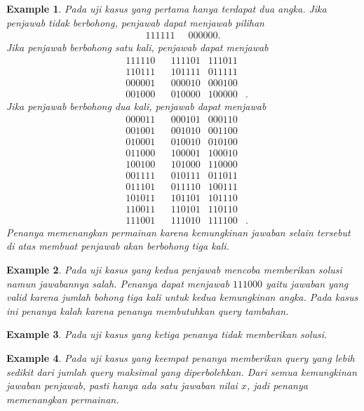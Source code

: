 \documentclass[conference,compsoc]{IEEEtran}
\newtheorem{exmp}{Example}[section]
\begin{document}
\begin{exmp}
Pada uji kasus yang pertama hanya terdapat dua angka. Jika penjawab tidak berbohong, penjawab dapat menjawab pilihan
\begin{align*}
111111 \;\;& 000000\textrm{.}
\end{align*}
Jika penjawab berbohong satu kali, penjawab dapat menjawab 
\begin{align*}
& 111110 & & 111101 & 111011 \\
& 110111 & & 101111 & 011111 \\
& 000001 & & 000010 & 000100 \\
& 001000 & & 010000 & 100000 &\textrm{.}
\end{align*}
Jika penjawab berbohong dua kali, penjawab dapat menjawab
\begin{align*}
& 000011 & & 000101 & 000110 \\
& 001001 & & 001010 & 001100 \\
& 010001 & & 010010 & 010100 \\
& 011000 & & 100001 & 100010 \\
& 100100 & & 101000 & 110000 \\
& 001111 & & 010111 & 011011 \\
& 011101 & & 011110 & 100111 \\
& 101011 & & 101101 & 101110 \\
& 110011 & & 110101 & 110110 \\
& 111001 & & 111010 & 111100 &\textrm{.}
\end{align*}
Penanya memenangkan permainan karena kemungkinan jawaban selain tersebut di atas membuat penjawab akan berbohong tiga kali.
\end{exmp}

\begin{exmp}
Pada uji kasus yang kedua penjawab mencoba memberikan solusi namun jawabannya salah. Penanya dapat menjawab $111000$ yaitu jawaban yang valid karena jumlah bohong tiga kali untuk kedua kemungkinan angka. Pada kasus ini penanya kalah karena penanya membutuhkan query tambahan.
\end{exmp}

\begin{exmp}
Pada uji kasus yang ketiga penanya tidak memberikan solusi.
\end{exmp}

\begin{exmp}
Pada uji kasus yang keempat penanya memberikan query yang lebih sedikit dari jumlah query maksimal yang diperbolehkan. Dari semua kemungkinan jawaban penjawab, pasti hanya ada satu jawaban nilai $x$, jadi penanya memenangkan permainan.
\end{exmp}
\end{document}
